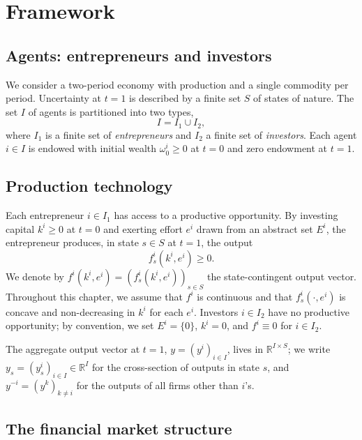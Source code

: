 \documentclass[11pt,a4paper,oneside]{book}
\def\R{\mathbb{R}}
\def\geq{\geqslant}
\theoremstyle{plain}
\theoremstyle{definition}
\theoremstyle{remark}
\numberwithin{equation}{chapter}
\begin{document}
\section{Framework}
\label{sec:MH-framework}

\subsection{Agents: entrepreneurs and investors}

We consider a two-period economy with production and a single commodity per period.
Uncertainty at $t=1$ is described by a finite set $S$ of states of nature.
The set $I$ of agents is partitioned into two types,
\begin{equation*}
  I = I_1 \cup I_2,
\end{equation*}
where $I_1$ is a finite set of \emph{entrepreneurs} and $I_2$ a finite set of \emph{investors}.
Each agent $i \in I$ is endowed with initial wealth $\omega^i_0 \geq 0$ at $t=0$ and zero endowment at $t=1$.

\subsection{Production technology}

Each entrepreneur $i \in I_1$ has access to a productive opportunity.
By investing capital $k^i \geq 0$ at $t=0$ and exerting effort $e^i$ drawn from an abstract set $E^i$, the entrepreneur produces, in state $s \in S$ at $t=1$, the output
\begin{equation*}
  f^i_s(k^i, e^i) \geq 0.
\end{equation*}
We denote by $f^i(k^i, e^i) = (f^i_s(k^i, e^i))_{s \in S}$ the state-contingent output vector.
Throughout this chapter, we assume that $f^i$ is continuous and that $f^i_s(\cdot, e^i)$ is concave and non-decreasing in $k^i$ for each $e^i$.
Investors $i \in I_2$ have no productive opportunity; by convention, we set $E^i = \{0\}$, $k^i = 0$, and $f^i \equiv 0$ for $i \in I_2$.

The aggregate output vector at $t=1$, $y = (y^i)_{i \in I}$, lives in $\R^{I \times S}$; we write $y_s = (y^i_s)_{i \in I} \in \R^I$ for the cross-section of outputs in state $s$, and $y^{-i} = (y^k)_{k \neq i}$ for the outputs of all firms other than $i$'s.

\subsection{The financial market structure}
\end{document}
